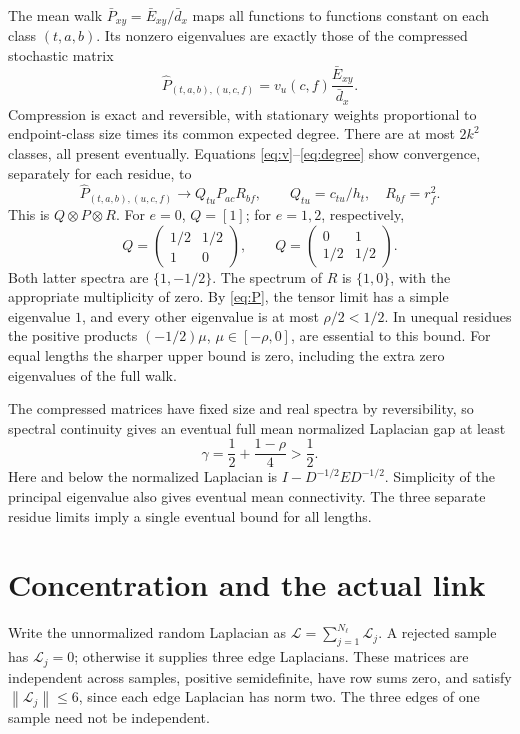 \documentclass[11pt,letterpaper]{article}
\newcommand{\norm}[1]{\left\lVert #1\right\rVert}
\begin{document}
The mean walk $\bar P_{xy}=\bar E_{xy}/\bar d_x$ maps all functions to functions constant on each class $(t,a,b)$. Its nonzero eigenvalues are exactly those of the compressed stochastic matrix
\[
 \widehat P_{(t,a,b),(u,c,f)}
       =v_u(c,f)\frac{\bar E_{xy}}{\bar d_x}.
\]
Compression is exact and reversible, with stationary weights proportional to endpoint-class size times its common expected degree. There are at most $2k^2$ classes, all present eventually. Equations \eqref{eq:v}--\eqref{eq:degree} show convergence, separately for each residue, to
\begin{equation}\label{eq:tensor}
 \widehat P_{(t,a,b),(u,c,f)}\longrightarrow
 Q_{tu}P_{ac}R_{bf},\qquad
 Q_{tu}=c_{tu}/h_t,\quad R_{bf}=r_f^2.
\end{equation}
This is $Q\otimes P\otimes R$. For $e=0$, $Q=[1]$; for $e=1,2$, respectively,
\[
 Q=\begin{pmatrix}1/2&1/2\\1&0\end{pmatrix},\qquad
 Q=\begin{pmatrix}0&1\\1/2&1/2\end{pmatrix}.
\]
Both latter spectra are $\{1,-1/2\}$. The spectrum of $R$ is $\{1,0\}$, with the appropriate multiplicity of zero. By \eqref{eq:P}, the tensor limit has a simple eigenvalue $1$, and every other eigenvalue is at most $\rho/2<1/2$. In unequal residues the positive products $(-1/2)\mu$, $\mu\in[-\rho,0]$, are essential to this bound. For equal lengths the sharper upper bound is zero, including the extra zero eigenvalues of the full walk.

The compressed matrices have fixed size and real spectra by reversibility, so spectral continuity gives an eventual full mean normalized Laplacian gap at least
\begin{equation}\label{eq:gamma}
 \gamma=\frac12+\frac{1-\rho}{4}>\frac12.
\end{equation}
Here and below the normalized Laplacian is $I-D^{-1/2}ED^{-1/2}$. Simplicity of the principal eigenvalue also gives eventual mean connectivity. The three separate residue limits imply a single eventual bound for all lengths.

\section{Concentration and the actual link}
Write the unnormalized random Laplacian as $\mathcal L=\sum_{j=1}^{N_\ell}\mathcal L_j$. A rejected sample has $\mathcal L_j=0$; otherwise it supplies three edge Laplacians. These matrices are independent across samples, positive semidefinite, have row sums zero, and satisfy $\norm{\mathcal L_j}\leq6$, since each edge Laplacian has norm two. The three edges of one sample need not be independent.
\end{document}
